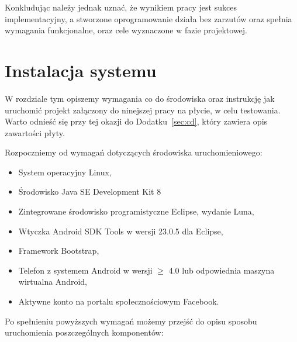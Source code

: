 \documentclass[12pt,titlepage]{article}
\begin{document}
Konkludując należy jednak uznać, że wynikiem pracy jest sukces implementacyjny, a stworzone oprogramowanie działa bez zarzutów oraz spełnia wymagania funkcjonalne, oraz cele wyznaczone w fazie projektowej.
\newpage
\section{Instalacja systemu}
W rozdziale tym opiszemy wymagania co do środowiska oraz instrukcję jak uruchomić projekt załączony do ninejszej pracy na płycie, w celu testowania.
Warto odnieść się przy tej okazji do Dodatku~\ref{sec:cd}, który zawiera opis zawartości płyty.

Rozpoczniemy od wymagań dotyczących środowiska uruchomieniowego:

\begin{itemize}
 \item System operacyjny Linux,
 \item Środowisko Java SE Development Kit 8
 \item Zintegrowane środowisko programistyczne Eclipse, wydanie Luna,
 \item Wtyczka Android SDK Tools w wersji 23.0.5 dla Eclipse,
 \item Framework Bootstrap,
 \item Telefon z systemem Android w wersji $\geqslant$ 4.0 lub odpowiednia maszyna wirtualna Android,
 \item Aktywne konto na portalu społecznościowym Facebook.
\end{itemize}

Po spełnieniu powyższych wymagań możemy przejść do opisu sposobu uruchomienia poszczególnych komponentów:
\end{document}
